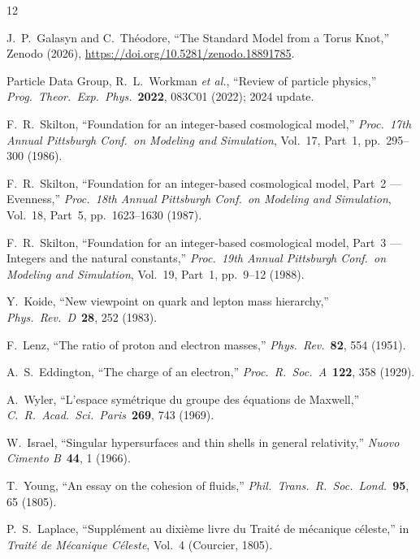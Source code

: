 \documentclass[11pt,a4paper]{article}
\begin{document}
\begin{thebibliography}{12}

J.~P.~Galasyn and C.~Th\'eodore,
``The Standard Model from a Torus Knot,''
Zenodo (2026), \url{https://doi.org/10.5281/zenodo.18891785}.

Particle Data Group, R.~L.~Workman \emph{et al.},
``Review of particle physics,''
\emph{Prog.\ Theor.\ Exp.\ Phys.}\ \textbf{2022}, 083C01 (2022); 2024 update.

F.~R.~Skilton,
``Foundation for an integer-based cosmological model,''
\emph{Proc.\ 17th Annual Pittsburgh Conf.\ on Modeling and Simulation},
Vol.~17, Part~1, pp.~295--300 (1986).

F.~R.~Skilton,
``Foundation for an integer-based cosmological model, Part~2 --- Evenness,''
\emph{Proc.\ 18th Annual Pittsburgh Conf.\ on Modeling and Simulation},
Vol.~18, Part~5, pp.~1623--1630 (1987).

F.~R.~Skilton,
``Foundation for an integer-based cosmological model, Part~3 --- Integers and the natural constants,''
\emph{Proc.\ 19th Annual Pittsburgh Conf.\ on Modeling and Simulation},
Vol.~19, Part~1, pp.~9--12 (1988).

Y.~Koide,
``New viewpoint on quark and lepton mass hierarchy,''
\emph{Phys.\ Rev.\ D}\ \textbf{28}, 252 (1983).

F.~Lenz,
``The ratio of proton and electron masses,''
\emph{Phys.\ Rev.}\ \textbf{82}, 554 (1951).

A.~S.~Eddington,
``The charge of an electron,''
\emph{Proc.\ R.\ Soc.\ A}\ \textbf{122}, 358 (1929).

A.~Wyler,
``L'espace sym\'etrique du groupe des \'equations de Maxwell,''
\emph{C.\ R.\ Acad.\ Sci.\ Paris}\ \textbf{269}, 743 (1969).

W.~Israel,
``Singular hypersurfaces and thin shells in general relativity,''
\emph{Nuovo Cimento B}\ \textbf{44}, 1 (1966).

T.~Young,
``An essay on the cohesion of fluids,''
\emph{Phil.\ Trans.\ R.\ Soc.\ Lond.}\ \textbf{95}, 65 (1805).

P.~S.~Laplace,
``Suppl\'ement au dixi\`eme livre du Trait\'e de m\'ecanique c\'eleste,''
in \emph{Trait\'e de M\'ecanique C\'eleste}, Vol.~4 (Courcier, 1805).

\end{thebibliography}
\end{document}
